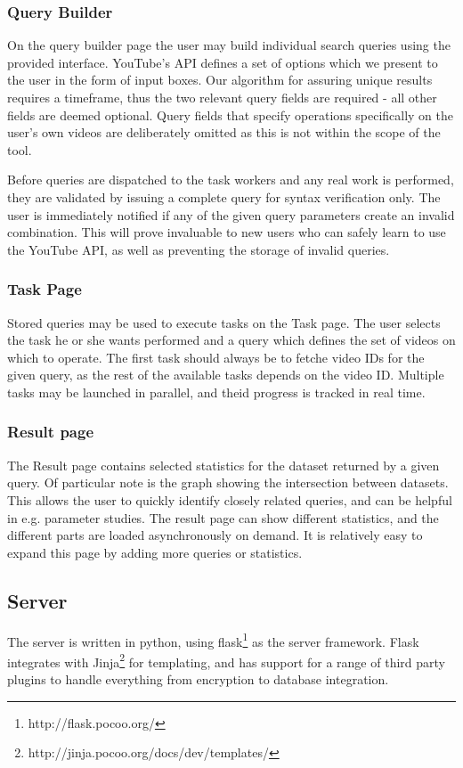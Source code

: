 \subsubsection{Query Builder}
On the query builder page the user may build individual search queries using
the provided interface. YouTube's API defines a set of options which we present
to the user in the form of input boxes. Our algorithm for assuring unique
results requires a timeframe, thus the two relevant query fields are required - 
all other fields are deemed optional. Query fields that specify operations
specifically on the user's own videos are deliberately omitted as this is
not within the scope of the tool.

Before queries are dispatched to the task workers and any real work is
performed, they are validated by issuing a complete query for syntax
verification only. The user is immediately notified if any of the given query
parameters create an invalid combination. This will prove invaluable to new
users who can safely learn to use the YouTube API, as well as preventing
the storage of invalid queries.

\subsubsection{Task Page}
Stored queries may be used to execute tasks on the Task page. The user selects
the task he or she wants performed and a query which defines the set of videos
on which to operate. The first task should always be to fetche video IDs for
the given query, as the rest of the available tasks depends on the video ID. 
Multiple tasks may be launched in parallel, and theid progress is tracked in
real time.

\subsubsection{Result page}
The Result page contains selected statistics for the dataset returned by a given
query. Of particular note is the graph showing the intersection between datasets.
This allows the user to quickly identify closely related queries, and can be
helpful in e.g. parameter studies. The result page can show different statistics,
and the different parts are loaded asynchronously on demand. It is relatively
easy to expand this page by adding more queries or statistics.

\subsection{Server}
The server is written in python, using flask\footnote{http://flask.pocoo.org/}
as the server framework. Flask integrates with 
Jinja\footnote{http://jinja.pocoo.org/docs/dev/templates/} for templating, 
and has support for a range of third party plugins to handle everything from
encryption to database integration.


